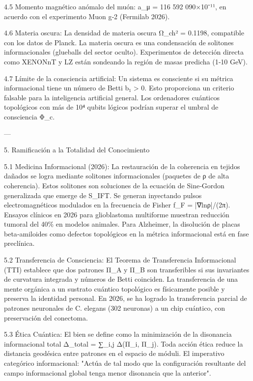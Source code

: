 \documentclass[12pt,twoside]{book}
\begin{document}
4.5 Momento magnético anómalo del muón:
a_μ = 116 592 090×10⁻¹¹, en acuerdo con el experimento Muon g‑2 (Fermilab 2026).

4.6 Materia oscura:
La densidad de materia oscura Ω_ch² = 0.1198, compatible con los datos de Planck. La materia oscura es una condensación de solitones informacionales (glueballs del sector oculto). Experimentos de detección directa como XENONnT y LZ están sondeando la región de masas predicha (1‑10 GeV).

4.7 Límite de la consciencia artificial:
Un sistema es consciente si su métrica informacional tiene un número de Betti b₁ > 0. Esto proporciona un criterio falsable para la inteligencia artificial general. Los ordenadores cuánticos topológicos con más de 10⁴ qubits lógicos podrían superar el umbral de consciencia Φ_c.

---

5. Ramificación a la Totalidad del Conocimiento

5.1 Medicina Informacional (2026):
La restauración de la coherencia en tejidos dañados se logra mediante solitones informacionales (paquetes de ρ de alta coherencia). Estos solitones son soluciones de la ecuación de Sine‑Gordon generalizada que emerge de S_IFT. Se generan inyectando pulsos electromagnéticos modulados en la frecuencia de Fisher f_F = |∇lnρ|/(2π). Ensayos clínicos en 2026 para glioblastoma multiforme muestran reducción tumoral del 40\% en modelos animales. Para Alzheimer, la disolución de placas beta‑amiloides como defectos topológicos en la métrica informacional está en fase preclínica.

5.2 Transferencia de Consciencia:
El Teorema de Transferencia Informacional (TTI) establece que dos patrones Π_A y Π_B son transferibles si sus invariantes de curvatura integrada y números de Betti coinciden. La transferencia de una mente orgánica a un sustrato cuántico topológico es físicamente posible y preserva la identidad personal. En 2026, se ha logrado la transferencia parcial de patrones neuronales de C. elegans (302 neuronas) a un chip cuántico, con preservación del conectoma.

5.3 Ética Cuántica:
El bien se define como la minimización de la disonancia informacional total Δ_total = ∑_{i,j} Δ(Π_i, Π_j). Toda acción ética reduce la distancia geodésica entre patrones en el espacio de móduli. El imperativo categórico informacional: "Actúa de tal modo que la configuración resultante del campo informacional global tenga menor disonancia que la anterior".
\end{document}
